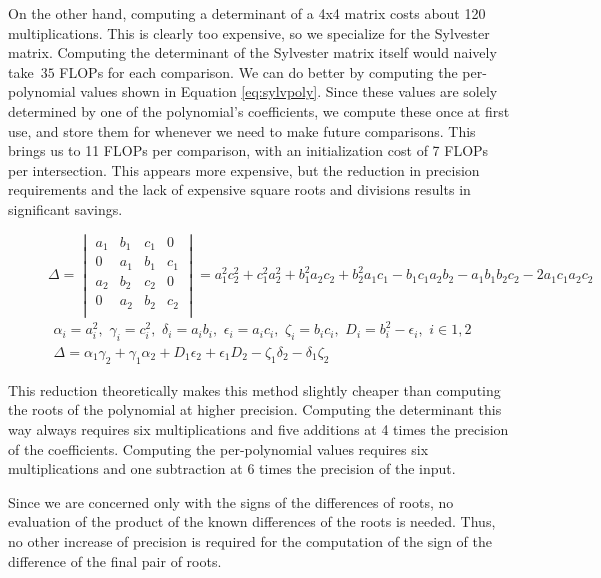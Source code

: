 \documentclass{cccg16}
\begin{document}
On the other hand, computing a determinant of a 4x4 matrix costs about
120 multiplications.  This is clearly too expensive, so we specialize
for the Sylvester matrix.  Computing the determinant of the Sylvester
matrix itself would naively take~$35$ FLOPs for each comparison.  We
can do better by computing the per-polynomial values shown in Equation
\ref{eq:sylvpoly}.  Since these values are solely determined by one of
the polynomial's coefficients, we compute these once at first use, and
store them for whenever we need to make future comparisons.  This
brings us to 11 FLOPs per comparison, with an initialization cost of 7
FLOPs per intersection.  This appears more expensive, but the
reduction in precision requirements and the lack of expensive square
roots and divisions results in significant savings.
\begin{figure}
  \begin{equation*}
    \Delta=\begin{vmatrix}
    a_1 & b_1 & c_1 & 0\\
    0 & a_1 & b_1 & c_1\\
    a_2 & b_2 & c_2 & 0\\
    0 & a_2 & b_2 & c_2\\
    \end{vmatrix}=
    a_1^2 c_2^2 + c_1^2 a_2^2 + b_1^2 a_2 c_2 + b_2^2 a_1 c_1 -
    b_1 c_1 a_2 b_2 - a_1 b_1 b_2 c_2 - 2 a_1 c_1 a_2 c_2
  \end{equation*}
  \begin{align}
    \alpha_i=a_i^2,\,\, \gamma_i=c_i^2,\,\,
    \delta_i=a_i b_i,\,\, \epsilon_i=a_i c_i,\,\, \zeta_i=b_i c_i,\,\,
    D_i=b_i^2-\epsilon_i,\,\,
    i\in {1, 2}\\
    \Delta = \alpha_1 \gamma_2 + \gamma_1 \alpha_2 +
    D_1 \epsilon_2 + \epsilon_1 D_2 - \zeta_1 \delta_2 -
    \delta_1 \zeta_2
  \label{eq:sylvpoly}
  \end{align}
\end{figure}
This reduction theoretically makes this method slightly cheaper than
computing the roots of the polynomial at higher precision.  Computing
the determinant this way always requires six multiplications and five
additions at 4 times the precision of the coefficients.  Computing the
per-polynomial values requires six multiplications and one subtraction
at 6 times the precision of the input.

Since we are concerned only with the signs of the differences of
roots, no evaluation of the product of the known differences of the
roots is needed.  Thus, no other increase of precision is required for
the computation of the sign of the difference of the final pair of
roots.
\end{document}

